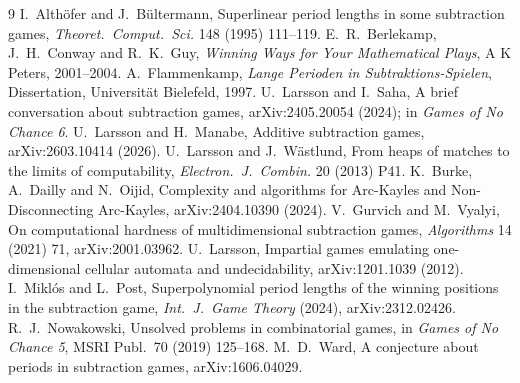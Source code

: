 \documentclass[11pt]{article}
\theoremstyle{definition}
\begin{document}
\begin{thebibliography}{9}
 I.~Althöfer and J.~Bültermann, Superlinear period lengths in some subtraction games,
\emph{Theoret.\ Comput.\ Sci.} 148 (1995) 111--119.
 E.~R.~Berlekamp, J.~H.~Conway and R.~K.~Guy, \emph{Winning Ways for Your Mathematical
Plays}, A K Peters, 2001--2004.
 A.~Flammenkamp, \emph{Lange Perioden in Subtraktions-Spielen}, Dissertation,
Universität Bielefeld, 1997.
 U.~Larsson and I.~Saha, A brief conversation about subtraction games,
arXiv:2405.20054 (2024); in \emph{Games of No Chance 6}.
 U.~Larsson and H.~Manabe, Additive subtraction games, arXiv:2603.10414 (2026).
 U.~Larsson and J.~Wästlund, From heaps of matches to the limits of computability,
\emph{Electron.\ J.\ Combin.} 20 (2013) P41.
 K.~Burke, A.~Dailly and N.~Oijid, Complexity and algorithms for Arc-Kayles and
Non-Disconnecting Arc-Kayles, arXiv:2404.10390 (2024).
 V.~Gurvich and M.~Vyalyi, On computational hardness of multidimensional subtraction
games, \emph{Algorithms} 14 (2021) 71, arXiv:2001.03962.
 U.~Larsson, Impartial games emulating one-dimensional cellular automata and
undecidability, arXiv:1201.1039 (2012).
 I.~Miklós and L.~Post, Superpolynomial period lengths of the winning positions in the
subtraction game, \emph{Int.\ J.\ Game Theory} (2024), arXiv:2312.02426.
 R.~J.~Nowakowski, Unsolved problems in combinatorial games, in \emph{Games of
No Chance 5}, MSRI Publ.\ 70 (2019) 125--168.
 M.~D.~Ward, A conjecture about periods in subtraction games, arXiv:1606.04029.
\end{thebibliography}
\end{document}
